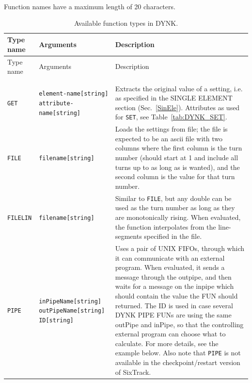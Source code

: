 Function names have a maximum length of 20 characters.


\begin{center}
\small
\begin{longtable}{|p{1.8cm} | p{4.1cm} | p{9.5cm}|}
    \caption{Available function types in DYNK.}
    \label{tab:DYNK_FUN} \\*
    \hline
    \rowcolor{blue!30}
    Type name & Arguments & Description \\*
    \hline
    \endfirsthead

    \hline
    \rowcolor{blue!30}
    Type name & Arguments & Description \\*
    \endhead

    \rowcolor{gray!15}
    \multicolumn{3}{|c|}{(The table continues on the next page)}\\*
    \hline
    \endfoot

    \hline
    \endlastfoot

    \rowcolor{blue!15}
    \multicolumn{3}{|l|}{``System'' functions} \\*
    \hline

    \texttt{GET} & \texttt{element-name[string] attribute-name[string]} &
    Extracts the original value of a setting, i.e. as specified in the SINGLE ELEMENT section (Sec.~\ref{SinEle}). Attributes as used for \texttt{SET}, see Table~\ref{tab:DYNK_SET}. \\*
    \hline

    \texttt{FILE} & \texttt{filename[string]} &
    Loads the settings from file; the file is expected to be an ascii file with two columns where the first column is the turn number (should start at 1 and include all turns up to as long as is wanted), and the second column is the value for that turn number.\\*
    \hline

    \texttt{FILELIN} & \texttt{filename[string]} &
    Similar to \texttt{FILE}, but any double can be used as the turn number as long as they are monotonically rising.
    When evaluated, the function interpolates from the line-segments specified in the file. \\*
    \hline

    \texttt{PIPE} & \texttt{inPipeName[string] outPipeName[string] ID[string]} &
    Uses a pair of UNIX FIFOs, through which it can communicate with an external program.
    When evaluated, it sends a message through the outpipe, and then waits for a message on the inpipe which should contain the value the FUN should returned.
    The ID is used in case several DYNK PIPE FUNs are using the same outPipe and inPipe, so that the controlling external program can choose what to calculate.
    For more details, see the example below.
    Also note that \texttt{PIPE} is not available in the checkpoint/restart version of SixTrack.\\*
    \hline


\end{longtable}
\end{center}
